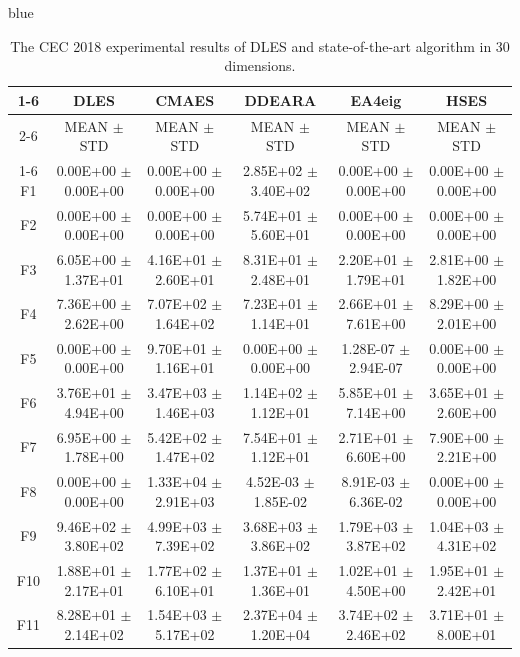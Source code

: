 \documentclass[journal, onecolumn]{IEEEtran}
\begin{document}
\begin{color}{blue}
\begin{table}[htbp!]
	\centering
	\caption{The CEC 2018 experimental results of DLES and state-of-the-art algorithm in 30 dimensions.}
	\label{CEC2018_30}
		\begin{tabular}{c|ccccc}
			\cline{1-6}
			 &	DLES			 &	CMAES				 &	DDEARA				 &	EA4eig				 &	HSES			\\	\cline{2-6}	
		&	MEAN	$\pm$	STD	 &	MEAN	$\pm$	STD		 &	MEAN	$\pm$	STD		 &	MEAN	$\pm$	STD		 &	MEAN	$\pm$	STD	\\	\cline{1-6}
		F1	 &	0.00E+00	$\pm$	0.00E+00	 &	0.00E+00	$\pm$	0.00E+00		 &	2.85E+02	$\pm$	3.40E+02		 &	0.00E+00	$\pm$	0.00E+00		 &	0.00E+00	$\pm$	0.00E+00	\\	
		F2	 &	0.00E+00	$\pm$	0.00E+00	 &	0.00E+00	$\pm$	0.00E+00		 &	5.74E+01	$\pm$	5.60E+01		 &	0.00E+00	$\pm$	0.00E+00		 &	0.00E+00	$\pm$	0.00E+00	\\	
		F3	 &	6.05E+00	$\pm$	1.37E+01	 &	4.16E+01	$\pm$	2.60E+01		 &	8.31E+01	$\pm$	2.48E+01		 &	2.20E+01	$\pm$	1.79E+01		 &	2.81E+00	$\pm$	1.82E+00	\\	
		F4	 &	7.36E+00	$\pm$	2.62E+00	 &	7.07E+02	$\pm$	1.64E+02		 &	7.23E+01	$\pm$	1.14E+01		 &	2.66E+01	$\pm$	7.61E+00		 &	8.29E+00	$\pm$	2.01E+00	\\	
		F5	 &	0.00E+00	$\pm$	0.00E+00	 &	9.70E+01	$\pm$	1.16E+01		 &	0.00E+00	$\pm$	0.00E+00		 &	1.28E-07	$\pm$	2.94E-07		 &	0.00E+00	$\pm$	0.00E+00	\\	
		F6	 &	3.76E+01	$\pm$	4.94E+00	 &	3.47E+03	$\pm$	1.46E+03		 &	1.14E+02	$\pm$	1.12E+01		 &	5.85E+01	$\pm$	7.14E+00		 &	3.65E+01	$\pm$	2.60E+00	\\	
		F7	 &	6.95E+00	$\pm$	1.78E+00	 &	5.42E+02	$\pm$	1.47E+02		 &	7.54E+01	$\pm$	1.12E+01		 &	2.71E+01	$\pm$	6.60E+00		 &	7.90E+00	$\pm$	2.21E+00	\\	
		F8	 &	0.00E+00	$\pm$	0.00E+00	 &	1.33E+04	$\pm$	2.91E+03		 &	4.52E-03	$\pm$	1.85E-02		 &	8.91E-03	$\pm$	6.36E-02		 &	0.00E+00	$\pm$	0.00E+00	\\	
		F9	 &	9.46E+02	$\pm$	3.80E+02	 &	4.99E+03	$\pm$	7.39E+02		 &	3.68E+03	$\pm$	3.86E+02		 &	1.79E+03	$\pm$	3.87E+02		 &	1.04E+03	$\pm$	4.31E+02	\\	
		F10	 &	1.88E+01	$\pm$	2.17E+01	 &	1.77E+02	$\pm$	6.10E+01		 &	1.37E+01	$\pm$	1.36E+01		 &	1.02E+01	$\pm$	4.50E+00		 &	1.95E+01	$\pm$	2.42E+01	\\	
		F11	 &	8.28E+01	$\pm$	2.14E+02	 &	1.54E+03	$\pm$	5.17E+02		 &	2.37E+04	$\pm$	1.20E+04		 &	3.74E+02	$\pm$	2.46E+02		 &	3.71E+01	$\pm$	8.00E+01	\\	

\end{tabular}
\end{table}
\end{color}
\end{document}
